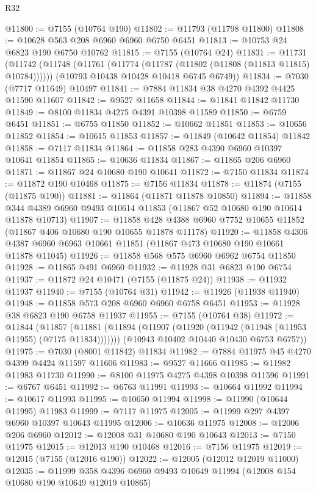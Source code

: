 \begin{lexlean}{R32}
\begin{coremodule}
@11800 := @7155 (@10764 @190)
@11802 := @11793 (@11798 @11800)
@11808 := @10628 @563 @208 @6960 @6960 @6750 @6451
@11813 := @10753 @24 @6823 @190 @6750 @10762
@11815 := @7155 (@10764 @24)
@11831 := @11731
    (@11742
      (@11748 (@11761 (@11774 (@11787 (@11802 (@11808 (@11813 @11815) @10784))))))
      (@10793 @10438 @10428 @10418 @6745 @6749))
@11834 := @7030 (@7717 @11649) @10497
@11841 := @7884 @11834 @38 @4270 @4392 @4425 @11590 @11607
@11842 := @9527 @11658
@11844 := @11841 @11842 @11730
@11849 := @8100 @11834 @4275 @4391 @10398 @11589
@11850 := @6759 @6451
@11851 := @6755 @11850
@11852 := @10662 @11851
@11853 := @10656 @11852
@11854 := @10615 @11853
@11857 := @11849 (@10642 @11854) @11842
@11858 := @7117 @11834
@11864 := @11858 @283 @4390 @6960 @10397 @10641 @11854
@11865 := @10636 @11834
@11867 := @11865 @206 @6960
@11871 := @11867 @24 @10680 @190 @10641
@11872 := @7150 @11834
@11874 := @11872 @190 @10468
@11875 := @7156 @11834
@11878 := @11874 (@7155 (@11875 @190))
@11881 := @11864 (@11871 @11878 @10850)
@11894 := @11858 @344 @4389 @6960 @9493 @10614 @11853 (@11867 @52 @10680 @190 @10614 @11878 @10713)
@11907 := @11858 @428 @4388 @6960 @7752 @10655 @11852 (@11867 @406 @10680 @190 @10655 @11878 @11178)
@11920 := @11858
    @4306
    @4387
    @6960
    @6963
    @10661
    @11851
    (@11867 @473 @10680 @190 @10661 @11878 @11045)
@11926 := @11858 @568 @575 @6960 @6962 @6754 @11850
@11928 := @11865 @491 @6960
@11932 := @11928 @31 @6823 @190 @6754
@11937 := @11872 @24 @10471 (@7155 (@11875 @24))
@11938 := @11932 @11937
@11940 := @7155 (@10764 @31)
@11942 := @11926 (@11938 @11940)
@11948 := @11858 @573 @208 @6960 @6960 @6758 @6451
@11953 := @11928 @38 @6823 @190 @6758 @11937
@11955 := @7155 (@10764 @38)
@11972 := @11844
    (@11857
      (@11881 (@11894 (@11907 (@11920 (@11942 (@11948 (@11953 @11955) (@7175 @11834)))))))
      (@10943 @10402 @10440 @10430 @6753 @6757))
@11975 := @7030 (@8001 @11842) @11834
@11982 := @7884 @11975 @45 @4270 @4399 @4424 @11597 @11606
@11983 := @9527 @11666
@11985 := @11982 @11983 @11730
@11990 := @8100 @11975 @4275 @4398 @10398 @11596
@11991 := @6767 @6451
@11992 := @6763 @11991
@11993 := @10664 @11992
@11994 := @10617 @11993
@11995 := @10650 @11994
@11998 := @11990 (@10644 @11995) @11983
@11999 := @7117 @11975
@12005 := @11999 @297 @4397 @6960 @10397 @10643 @11995
@12006 := @10636 @11975
@12008 := @12006 @206 @6960
@12012 := @12008 @31 @10680 @190 @10643
@12013 := @7150 @11975
@12015 := @12013 @190 @10468
@12016 := @7156 @11975
@12019 := @12015 (@7155 (@12016 @190))
@12022 := @12005 (@12012 @12019 @11000)
@12035 := @11999 @358 @4396 @6960 @9493 @10649 @11994 (@12008 @154 @10680 @190 @10649 @12019 @10865)

\end{coremodule}
\end{lexlean}

